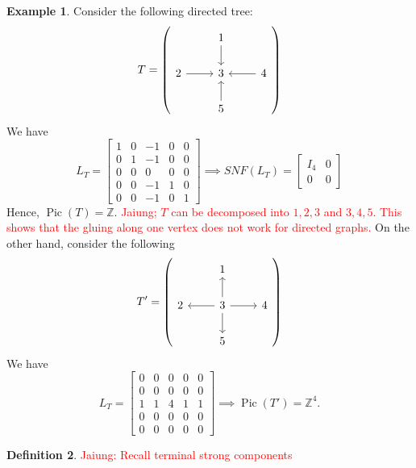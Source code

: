 \documentclass[11pt,reqno]{amsart}
\DeclareMathOperator{\Pic}{Pic}
\theoremstyle{definition}
\newtheorem{mydef}{\textbf{Definition}}[section]
\newtheorem{myeg}[mydef]{\textbf{Example}}
\theoremstyle{plain}
\begin{document}
\begin{myeg}
Consider the following directed tree:
\begin{equation}
T=\left(\begin{tikzcd}
	& 1 \arrow[d] & \\
2 \arrow[r]& 3 & 4 \arrow[l]\\
& 5 \arrow[u] &
\end{tikzcd} \right)
\end{equation}
We have
\[
L_T = \begin{bmatrix}
 1& 0& -1&0 &0 \\
 0 & 1 & -1 & 0 &0\\
 0& 0& 0& 0 &0\\
 0& 0&-1&1 & 0\\
 0& 0&-1&0 & 1
\end{bmatrix} \implies SNF(L_T)=\left[\begin{array}{c|c}
I_4 & 0 \\ \hline
0 & 0
\end{array}\right]
\]
Hence, $\Pic(T)=\mathbb{Z}$. \textcolor{red}{Jaiung; $T$ can be decomposed into $1,2,3$ and $3,4,5$. This shows that the gluing along one vertex does not work for directed graphs.} On the other hand, consider the following
\begin{equation}
T'=\left(\begin{tikzcd}
		& 1 & \\
		2 & 3 \arrow[u] \arrow[r]\arrow[l] \arrow[d]& 4 \\
		& 5  &
	\end{tikzcd} \right)
\end{equation}
We have
\[
L_T = \begin{bmatrix}
	0& 0& 0&0 &0 \\
	0 & 0 & 0 & 0 &0\\
	1& 1& 4& 1 &1\\
	0& 0&0&0 & 0\\
	0& 0&0&0 & 0
\end{bmatrix} \implies \Pic(T')=\mathbb{Z}^4.
\]
\end{myeg}

\begin{mydef}
\textcolor{red}{Jaiung: Recall terminal strong components}
\end{mydef}
\end{document}
